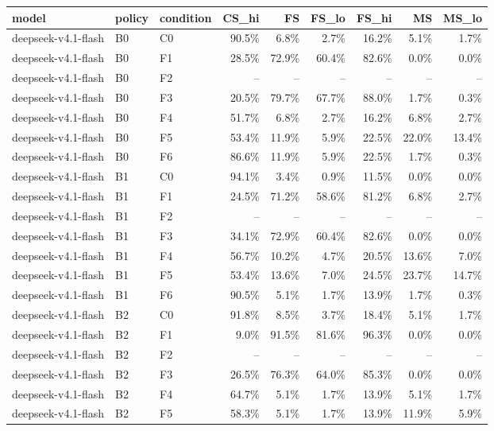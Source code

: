 \begin{tabular}{lllrrrrrr}
\toprule
model & policy & condition & CS\_hi & FS & FS\_lo & FS\_hi & MS & MS\_lo \\
\midrule
deepseek-v4.1-flash & B0 & C0 & 90.5\% & 6.8\% & 2.7\% & 16.2\% & 5.1\% & 1.7\% \\
deepseek-v4.1-flash & B0 & F1 & 28.5\% & 72.9\% & 60.4\% & 82.6\% & 0.0\% & 0.0\% \\
deepseek-v4.1-flash & B0 & F2 & -- & -- & -- & -- & -- & -- \\
deepseek-v4.1-flash & B0 & F3 & 20.5\% & 79.7\% & 67.7\% & 88.0\% & 1.7\% & 0.3\% \\
deepseek-v4.1-flash & B0 & F4 & 51.7\% & 6.8\% & 2.7\% & 16.2\% & 6.8\% & 2.7\% \\
deepseek-v4.1-flash & B0 & F5 & 53.4\% & 11.9\% & 5.9\% & 22.5\% & 22.0\% & 13.4\% \\
deepseek-v4.1-flash & B0 & F6 & 86.6\% & 11.9\% & 5.9\% & 22.5\% & 1.7\% & 0.3\% \\
deepseek-v4.1-flash & B1 & C0 & 94.1\% & 3.4\% & 0.9\% & 11.5\% & 0.0\% & 0.0\% \\
deepseek-v4.1-flash & B1 & F1 & 24.5\% & 71.2\% & 58.6\% & 81.2\% & 6.8\% & 2.7\% \\
deepseek-v4.1-flash & B1 & F2 & -- & -- & -- & -- & -- & -- \\
deepseek-v4.1-flash & B1 & F3 & 34.1\% & 72.9\% & 60.4\% & 82.6\% & 0.0\% & 0.0\% \\
deepseek-v4.1-flash & B1 & F4 & 56.7\% & 10.2\% & 4.7\% & 20.5\% & 13.6\% & 7.0\% \\
deepseek-v4.1-flash & B1 & F5 & 53.4\% & 13.6\% & 7.0\% & 24.5\% & 23.7\% & 14.7\% \\
deepseek-v4.1-flash & B1 & F6 & 90.5\% & 5.1\% & 1.7\% & 13.9\% & 1.7\% & 0.3\% \\
deepseek-v4.1-flash & B2 & C0 & 91.8\% & 8.5\% & 3.7\% & 18.4\% & 5.1\% & 1.7\% \\
deepseek-v4.1-flash & B2 & F1 & 9.0\% & 91.5\% & 81.6\% & 96.3\% & 0.0\% & 0.0\% \\
deepseek-v4.1-flash & B2 & F2 & -- & -- & -- & -- & -- & -- \\
deepseek-v4.1-flash & B2 & F3 & 26.5\% & 76.3\% & 64.0\% & 85.3\% & 0.0\% & 0.0\% \\
deepseek-v4.1-flash & B2 & F4 & 64.7\% & 5.1\% & 1.7\% & 13.9\% & 5.1\% & 1.7\% \\
deepseek-v4.1-flash & B2 & F5 & 58.3\% & 5.1\% & 1.7\% & 13.9\% & 11.9\% & 5.9\% \\

\end{tabular}

